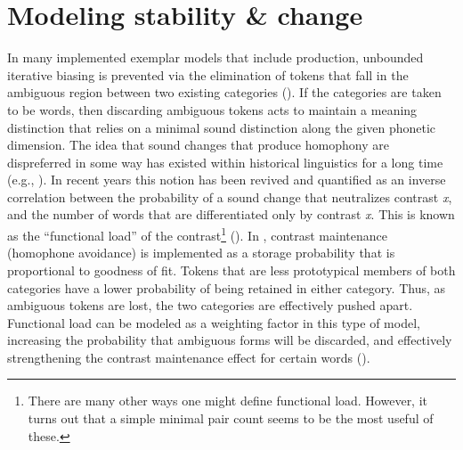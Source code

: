 \chapter{\label{sec:Models-of-Change}Modeling stability \& change}

In many implemented exemplar models that include production, unbounded
iterative biasing is prevented via the elimination of tokens that
fall in the ambiguous region between two existing categories (\citealp{Wedel2004,Wedel2006,Wedel2008,Blevins2009,DBLP:journals/corr/Tupper14a}).
If the categories are taken to be words, then discarding ambiguous
tokens acts to maintain a meaning distinction that relies on a minimal
sound distinction along the given phonetic dimension. The idea that
sound changes that produce homophony are dispreferred in some way
has existed within historical linguistics for a long time (e.g., \citealt{Martinet1955}).
In recent years this notion has been revived and quantified as an
inverse correlation between the probability of a sound change that
neutralizes contrast \emph{x}, and the number of words that are differentiated
only by contrast \emph{x}. This is known as the “functional load”
of the contrast\footnote{There are many other ways one might define functional load. However,
it turns out that a simple minimal pair count seems to be the most
useful of these.} (\citealp{Surendran2006,wedel2013high}). In \citet{Wedel2008},
contrast maintenance (homophone avoidance) is implemented as a storage
probability that is proportional to goodness of fit. Tokens that are
less prototypical members of both categories have a lower probability
of being retained in either category. Thus, as ambiguous tokens are
lost, the two categories are effectively pushed apart. Functional
load can be modeled as a weighting factor in this type of model, increasing
the probability that ambiguous forms will be discarded, and effectively
strengthening the contrast maintenance effect for certain words (\citealt{Soskuthy2015}).

